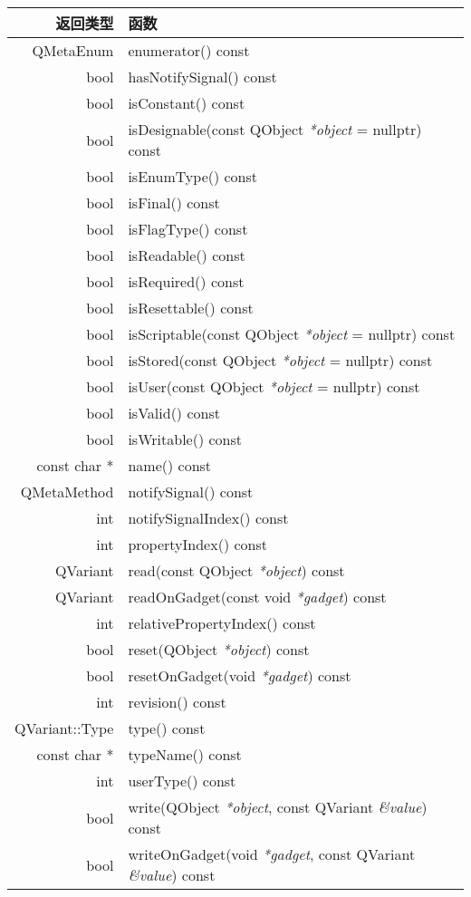 \begin{longtable}{|r|m{28em}|}   
\hline
返回类型 	& 函数 \\
\hline
QMetaEnum &	enumerator() const \\
\hline 
bool &	hasNotifySignal() const \\ 
\hline
bool &	isConstant() const \\ 
\hline
bool &	isDesignable(const QObject \emph{*object} = nullptr) const \\
\hline
bool &	isEnumType() const \\
\hline
bool 	&isFinal() const \\ 
\hline
bool 	&isFlagType() const \\ 
\hline
bool &	isReadable() const \\ 
\hline
bool &	isRequired() const\\
\hline
bool &	isResettable() const\\
\hline
bool &	isScriptable(const QObject \emph{*object} = nullptr) const\\
\hline
bool 	&isStored(const QObject \emph{*object} = nullptr) const\\
\hline
bool 	&isUser(const QObject \emph{*object} = nullptr) const\\
\hline
bool &	isValid() const\\
\hline
bool 	&isWritable() const\\
\hline
const char * &	name() const\\
\hline
QMetaMethod &	notifySignal() const\\
\hline
int 	& notifySignalIndex() const\\
\hline
int  &	propertyIndex() const\\
\hline
QVariant &	read(const QObject \emph{*object}) const \\
\hline
QVariant 	&readOnGadget(const void \emph{*gadget}) const \\
\hline
int 	&relativePropertyIndex() const\\
\hline
bool &	reset(QObject \emph{*object}) const\\
\hline
bool 	&resetOnGadget(void \emph{*gadget}) const \\
\hline
int 	&revision() const\\
\hline
QVariant::Type &	type() const \\
\hline
const char * &	typeName() const \\ 
\hline
int 	& userType() const \\ 
\hline
bool &	write(QObject \emph{*object}, const QVariant \emph{\&value}) const \\ 
\hline
bool 	&writeOnGadget(void \emph{*gadget}, const QVariant \emph{\&value}) const \\ 
\hline
\end{longtable}


